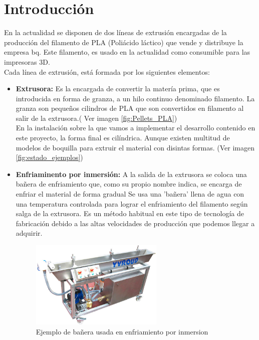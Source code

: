 \chapter{Introducción}
\label{introduccion}

En la actualidad se disponen de dos líneas de extrusión encargadas de la producción del filamento de PLA (Poliácido láctico) que vende y distribuye la empresa bq. Este filamento, es usado en la actualidad como consumible para las impresoras 3D.\\

Cada línea de extrusión, está formada por los siguientes elementos:

\begin{itemize}
    \item \textbf{Extrusora:} Es la encargada de convertir la matería prima, que es introducida en forma de granza, a un hilo continuo denominado filamento. La granza son pequeños cilindros de PLA que son convertidos en filamento al salir de la extrusora.( Ver imagen \ref{fig:Pellets_PLA})\\
    En la instalación sobre la que vamos a implementar el desarrollo contenido en este proyecto, la forma final es cilíndrica. Aunque existen multitud de modelos de boquilla para extruir el material con disintas formas. (Ver imagen \ref{fig:estado_ejemplos})
    \item \textbf{Enfriaminento por inmersión:} 
    A la salida de la extrusora se coloca una bañera de enfriamiento que, como su propio nombre indica, se encarga de enfriar el material de forma gradual
    Se usa una 'bañera' llena de agua con una temperatura controlada para lograr el enfriamiento del filamento según salga de la extrusora.
    Es un método habitual en este tipo de tecnología de fabricación debido a las altas velocidades de producción que podemos llegar a adquirir.
    \begin{figure}[H]
    	\centering
    	\includegraphics[width=0.6\textwidth]{images/enfriamiento.png}
    	\caption{Ejemplo de bañera usada en enfriamiento por inmersion}

\end{figure}
\end{itemize}
